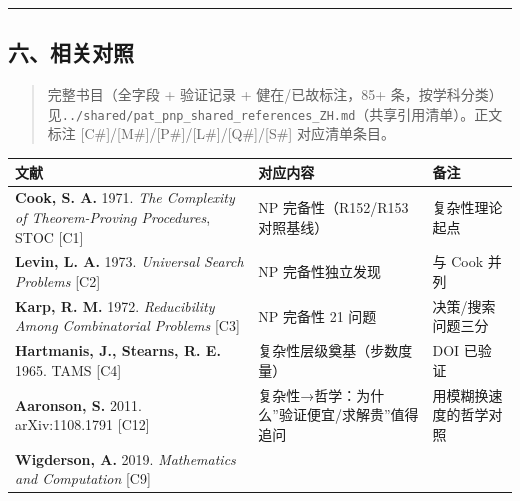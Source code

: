 \documentclass[
]{article}
\newcounter{none} %
\begin{document}
\begin{center}\rule{0.5\linewidth}{0.5pt}\end{center}

\subsection{六、相关对照}\label{ux516dux76f8ux5173ux5bf9ux7167}

\begin{quote}
完整书目（全字段 + 验证记录 + 健在/已故标注，85+
条，按学科分类）见\texttt{../shared/pat\_pnp\_shared\_references\_ZH.md}（共享引用清单）。正文标注
{[}C\#{]}/{[}M\#{]}/{[}P\#{]}/{[}L\#{]}/{[}Q\#{]}/{[}S\#{]}
对应清单条目。
\end{quote}

{\def\LTcaptype{none} %
\begin{longtable}[]{@{}
  >{\raggedright\arraybackslash}p{}
  >{\raggedright\arraybackslash}p{}
  >{\raggedright\arraybackslash}p{}@{}}
\toprule\noalign{}
\begin{minipage}[b]{\linewidth}\raggedright
文献
\end{minipage} & \begin{minipage}[b]{\linewidth}\raggedright
对应内容
\end{minipage} & \begin{minipage}[b]{\linewidth}\raggedright
备注
\end{minipage} \\
\midrule\noalign{}
\endhead
\bottomrule\noalign{}
\endlastfoot
\textbf{Cook, S. A.} 1971. \emph{The Complexity of Theorem-Proving
Procedures}, STOC {[}C1{]} & NP 完备性（R152/R153 对照基线） &
复杂性理论起点 \\
\textbf{Levin, L. A.} 1973. \emph{Universal Search Problems} {[}C2{]} &
NP 完备性独立发现 & 与 Cook 并列 \\
\textbf{Karp, R. M.} 1972. \emph{Reducibility Among Combinatorial
Problems} {[}C3{]} & NP 完备性 21 问题 & 决策/搜索问题三分 \\
\textbf{Hartmanis, J., Stearns, R. E.} 1965. TAMS {[}C4{]} &
复杂性层级奠基（步数度量） & DOI 已验证 \\
\textbf{Aaronson, S.} 2011. arXiv:1108.1791 {[}C12{]} &
复杂性→哲学：为什么''验证便宜/求解贵''值得追问 &
用模糊换速度的哲学对照 \\
\textbf{Wigderson, A.} 2019. \emph{Mathematics and Computation} {[}C9{]}

\end{longtable}}
\end{document}
